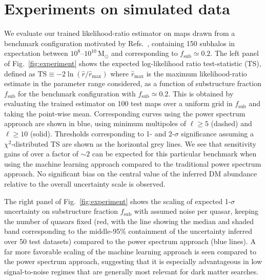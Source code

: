 \documentclass[preprint]{article}
\begin{document}
\section{Experiments on simulated data}
\label{sec:experiments}

We evaluate our trained likelihood-ratio estimator on maps drawn from a benchmark configuration motivated by Refs.~\cite{Hutten:2016jko,Springel:2008cc}, containing 150 subhalos in expectation between $10^{8}$--$10^{10}\,\mathrm{M}_\odot$ and corresponding to $f_\mathrm{sub} \simeq 0.2$. The left panel of Fig.~\ref{fig:experiment} shows the expected log-likelihood ratio test-statistic (TS), defined as $\mathrm{TS} \equiv -2\ln(\hat r / \hat r_\mathrm{max})$ where $\hat r_\mathrm{max}$ is the maximum likelihood-ratio estimate in the parameter range considered, as a function of substructure fraction $f_\mathrm{sub}$ for the benchmark configuration with $f_\mathrm{sub} \simeq 0.2$. This is obtained by evaluating the trained estimator on 100 test maps over a uniform grid in $f_\mathrm{sub}$ and taking the point-wise mean. Corresponding curves using the power spectrum approach are shown in blue, using minimum multipoles of $\ell \geq 5$ (dashed) and $\ell \geq 10$ (solid). Thresholds corresponding to 1- and 2-$\sigma$ significance assuming a $\chi^2$-distributed TS are shown as the horizontal grey lines. We see that sensitivity gains of over a factor of $\sim 2$ can be expected for this particular benchmark when using the machine learning approach compared to the traditional power spectrum approach. No significant bias on the central value of the inferred DM abundance relative to the overall uncertainty scale is observed.

The right panel of Fig.~\ref{fig:experiment} shows the scaling of expected 1-$\sigma$ uncertainty on substructure fraction $f_\mathrm{sub}$ with assumed noise per quasar, keeping the number of quasars fixed (red, with the line showing the median and shaded band corresponding to the middle-95\% containment of the uncertainty inferred over 50 test datasets) compared to the power spectrum approach (blue lines). A far more favorable scaling of the machine learning approach is seen compared to the power spectrum approach, suggesting that it is especially advantageous in low signal-to-noise regimes that are generally most relevant for dark matter searches.
\end{document}
